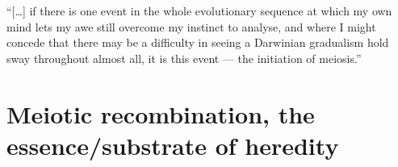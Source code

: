 \begin{savequote}[8cm]
“[…] if there is one event in the whole evolutionary sequence at which my own mind lets my awe still overcome my instinct to analyse, and where I might concede that there may be a difficulty in seeing a Darwinian gradualism hold sway throughout almost all, it is this event — the initiation of meiosis.”
	


\end{savequote}

\chapter{\label{ch:2-recombination-mechanistics}Meiotic recombination, the essence/substrate of heredity} 

\minitoc{}



